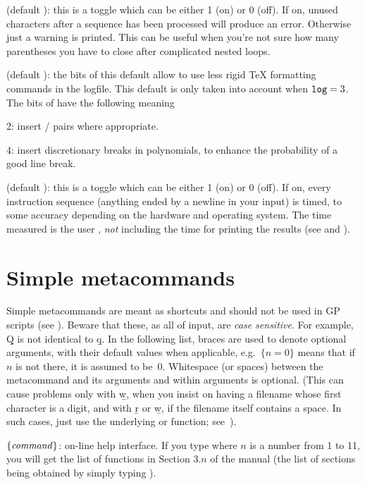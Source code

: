  (default ): this is a toggle which can be
either 1 (on) or 0 (off). If on, unused characters after a sequence has been
processed will produce an error. Otherwise just a warning is printed. This
can be useful when you're not sure how many parentheses you have to close after
complicated nested loops.

 (default ): the bits of this default allow
 to use less rigid TeX formatting commands in the logfile. This
default is only taken into account when ${\tt log} = 3$. The bits of
 have the following meaning

2: insert  /  pairs where appropriate.

4: insert discretionary breaks in polynomials, to enhance the probability of
a good line break.

 (default ): this is a toggle which can be either 1
(on) or 0 (off). If on, every instruction sequence (anything ended by a
newline in your input) is timed, to some accuracy depending on the hardware
and operating system. The time measured is the user ,
\emph{not} including the time for printing the results (see \kbd{\#} and
\kbd{\#\#}).

\section{Simple metacommands}\label{se:meta}

\noindent
Simple metacommands are meant as shortcuts and should not be used in GP
scripts (see ). Beware that these, as all of  input,
are \emph{case sensitive}. For example, \b{Q} is not identical to \b{q}. In
the following list, braces are used to denote optional arguments, with their
default values when applicable, e.g.~$\{n=0\}$ means that if $n$ is not
there, it is assumed to be~$0$. Whitespace (or spaces) between the
metacommand and its arguments and within arguments is optional. (This can
cause problems only with \b{w}, when you insist on having a filename whose
first character is a digit, and with \b{r} or \b{w}, if the filename itself
contains a space. In such cases, just use the underlying  or
 function; see~).

 $\{\hbox{\it command\/}\}$:  on-line help interface.
If you type  where $n$ is a number from 1 to 11, you will get the
list of functions in Section $3.n$ of the manual (the list of sections being
obtained by simply typing ). \label{se:exthelp}

